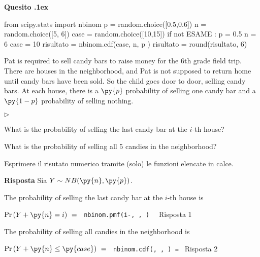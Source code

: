 \documentclass[11pt,twoside,a4paper]{article}
\newcommand{\mylabel}[1]{#1\hfill}
\renewenvironment{itemize}
  {\begin{list}{$\triangleright$}{%
   \setlength{\parskip}{0mm}
   \setlength{\topsep}{.4\baselineskip}
   \setlength{\rightmargin}{0mm}
   \setlength{\listparindent}{0mm}
   \setlength{\itemindent}{0mm}
   \setlength{\labelwidth}{2ex}
   \setlength{\itemsep}{.4\baselineskip}
   \setlength{\parsep}{0mm}
   \setlength{\partopsep}{0mm}
   \setlength{\labelsep}{1ex}
   \setlength{\leftmargin}{\labelwidth+\labelsep}
   \let\makelabel\mylabel}}{%
   \end{list}\vspace*{-1.3mm}}
\newcounter{quesito}
\newenvironment{question}{\addtocounter{quesito}{1}\par\textbf{Quesito \thequesito.\kern1ex}}{\vspace{0.5\parskip}}
\newenvironment{answer}{\par\textbf{Risposta\quad}}{\vspace{\parskip}}
\begin{document}
\begin{question}
\def\Pr{{\rm Pr\,}}
\def\Ex{{\rm E\,}}
\def\Var{{\rm Var\,}}
\begin{pycode}
from scipy.stats import nbinom
p = random.choice([0.5,0.6])
n = random.choice([5, 6])
case = random.choice([10,15])
if not ESAME :
   p = 0.5
   n = 6
   case = 10
risultato = nbinom.cdf(case, n, p )
risultato = round(risultato, 6)
\end{pycode}
Pat is required to sell candy bars to raise money for the 6th grade field trip. There are  houses in the neighborhood, and Pat is not supposed to return home until  candy bars have been sold. So the child goes door to door, selling candy bars. At each house, there is a $\py{p}$ probability of selling one candy bar and a $\py{1-p}$ probability of selling nothing.
\begin{itemize}
\item[1.] What is the probability of selling the last candy bar at the $i$-th house? 
\item[2.] What is the probability of selling all 5 candies in the neighborhood? 
\end{itemize}

Esprimere il risutato numerico tramite (solo) le funzioni elencate in calce. 
\begin{answer}
Sia $Y\sim NB(\py{n},\py{p})$.

The probability of selling the last candy bar at the $i$-th house is 

$\Pr(Y+\py{n}=i)\ =\ ${\tt{\color{blue}\ nbinom.pmf(i-, ,  ) } } {\color{blue}\hfill Risposta 1}

The probability of selling all  candies in the neighborhood is 

$\Pr(Y+\py{n}\le\py{case})\ =\ ${\tt{\color{blue}\ nbinom.cdf(, ,  ) }=  } {\color{blue}\hfill Risposta 2}\par
\end{answer}
\end{question}
\end{document}
